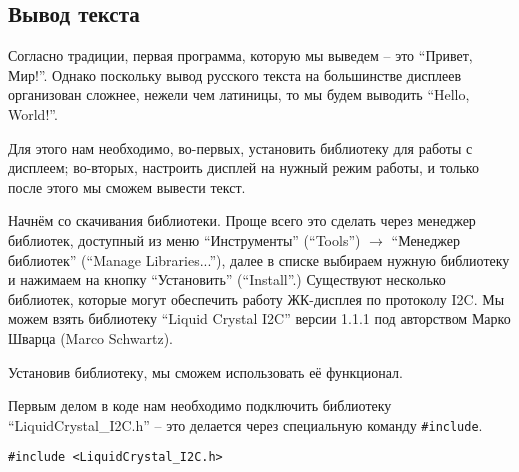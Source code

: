\documentclass[../sparc.tex]{subfiles}
\begin{document}

\subsection{Вывод текста}



Согласно традиции, первая программа, которую мы выведем -- это ``Привет, Мир!''.
Однако поскольку вывод русского текста на большинстве дисплеев организован
сложнее, нежели чем латиницы, то мы будем выводить ``Hello, World!''.

Для этого нам необходимо, во-первых, установить библиотеку для работы с
дисплеем; во-вторых, настроить дисплей на нужный режим работы, и только после
этого мы сможем вывести текст.

Начнём со скачивания библиотеки.  Проще всего это сделать через менеджер
библиотек, доступный из меню ``Инструменты'' (``Tools'') $\rightarrow$ ``Менеджер
библиотек'' (``Manage Libraries...''), далее в списке выбираем нужную библиотеку
и нажимаем на кнопку ``Установить'' (``Install''.)  Существуют несколько
библиотек, которые могут обеспечить работу ЖК-дисплея по протоколу \gls{I2C}.
Мы можем взять библиотеку ``Liquid Crystal I2C'' версии 1.1.1 под авторством
Марко Шварца (Marco Schwartz).

Установив библиотеку, мы сможем использовать её функционал.

Первым делом в коде нам необходимо подключить библиотеку
``LiquidCrystal\_I2C.h'' -- это делается через специальную команду
\texttt{\#include}.

\begin{verbatim}
#include <LiquidCrystal_I2C.h>
\end{verbatim}
\end{document}
